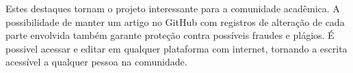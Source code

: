 Estes destaques tornam o projeto interessante para a comunidade acadêmica. A possibilidade de manter um artigo no GitHub com registros de alteração de cada parte envolvida também garante proteção contra possíveis fraudes e plágios. É possivel acessar e editar em qualquer plataforma com internet, tornando a escrita acessível a qualquer pessoa na comunidade.

